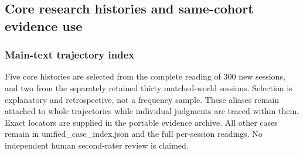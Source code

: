 \documentclass[10pt,a4paper]{article}
\begin{document}
\subsection{Core research histories and same-cohort evidence use}\label{core-research-histories-and-same-cohort-evidence-use}

\subsubsection{Main-text trajectory index}\label{main-text-trajectory-index}

Five core histories are selected from the complete reading of 300 new sessions, and two from the separately retained thirty matched-world sessions. Selection is explanatory and retrospective, not a frequency sample. These aliases remain attached to whole trajectories while individual judgments are traced within them. Exact locators are supplied in the portable evidence archive. All other cases remain in unified\_case\_index.json and the full per-session readings. No independent human second-rater review is claimed.
\end{document}

